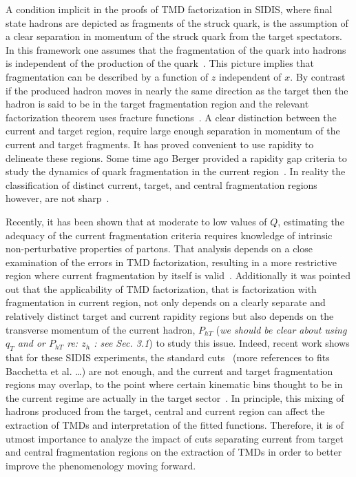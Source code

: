 \documentclass[final,3p,times,onecolumn,sort&compress,hidelinks]{elsarticle}
\newcommand\3[1]{\boldsymbol{#1}}
\begin{document}
 A condition implicit in the proofs of TMD factorization in SIDIS,
 where final state hadrons are depicted as  fragments of the
 struck quark, is the assumption of  a clear separation in momentum of the struck quark from the target spectators. In this framework one assumes that the fragmentation of the quark into hadrons is independent of the production of the quark~\cite{Berger:1987zu,Trentadue:1993ka}. This picture
 implies that fragmentation can be described by a function of $z$ independent of $x$.  By contrast if the produced hadron moves in nearly the same direction as the target then the hadron is said to be in the target fragmentation region and the relevant factorization theorem uses fracture functions~\cite{Trentadue:1993ka,Grazzini:1997ih,Anselmino:2011ss}.   A clear distinction between the current and target  region, require large enough separation in momentum of the current and target fragments.  It has proved  convenient to use rapidity to delineate these regions.   Some time ago Berger provided a rapidity gap criteria  to study the dynamics of quark fragmentation in the current region~\cite{Berger:1987zu,Mulders:2000jt}.  In reality the classification of distinct current, target, and central fragmentation regions however, are not sharp~\cite{Berger:1987zu,Mulders:2000jt,Joosten:2013mia,Boglione:2016bph,Collins:2018teg}.

 Recently, it has been shown that at moderate to low values of $Q$, estimating the adequacy of the current fragmentation criteria requires knowledge of intrinsic non-perturbative properties of partons. That analysis depends on a close examination of the errors in TMD factorization, resulting in
 a more restrictive region where current fragmentation by itself is valid~\cite{Boglione:2016bph}.
   Additionally it was pointed out that the applicability of TMD factorization, that is factorization  with fragmentation in  current region, not only depends on a clearly separate and relatively distinct target and current rapidity regions but also depends on the transverse momentum of the current hadron, $P_{hT}$ ({\em we should be clear about using $q_T$ and or $P_{hT}$ re: $z_h$ : see Sec. 3.1})  
 to study this issue.  Indeed, recent work shows that for these SIDIS experiments, the standard cuts~\cite{Anselmino:2013lza} (more references to fits Bacchetta et al. \dots)
   are not enough, and the current and target fragmentation regions may overlap, to the point where certain kinematic bins thought to be in the current regime are actually in the target sector~\cite{Boglione:2016bph}.  In principle, this mixing of hadrons produced from the target, central and current region can affect the extraction of TMDs and interpretation of the fitted functions.
  Therefore, it is of utmost importance to analyze the impact of cuts separating current from target and central fragmentation regions on the extraction of TMDs in order to better improve the phenomenology moving forward.
\end{document}

